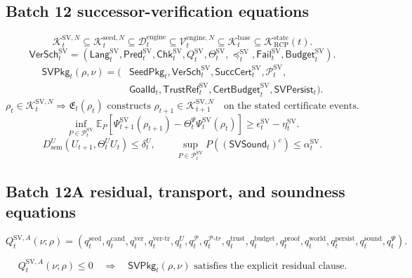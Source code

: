\documentclass[11pt]{article}
\newcommand{\K}{\mathcal{K}}
\newcommand{\Pcal}{\mathcal{P}}
\newcommand{\1}{\mathbf{1}}
\newcommand{\RCP}{\mathrm{RCP}}
\newcommand{\state}{\mathrm{state}}
\providecommand{\Dcal}{\mathcal{D}}
\providecommand{\Kcal}{\mathcal{K}}
\providecommand{\Vcal}{\mathcal{V}}
\providecommand{\sem}{\mathrm{sem}}
\begin{document}
\subsection{Batch 12 successor-verification equations}
\label{subsec:batch12_successor_verification_equations}
\[
\Kcal_t^{\mathrm{SV},N}
\subseteq
\Kcal_t^{\mathrm{seed},N}
\subseteq
\Dcal_t^{\mathrm{engine}}
\subseteq
\Vcal_t^{\mathrm{engine},N}
\subseteq
\Kcal_t^{\mathrm{base}}
\subseteq
\K_{\RCP}^{\state}(t).
\]
\[
\mathsf{VerSch}_t^{\mathrm{SV}}
=
(\mathsf{Lang}_t^{\mathrm{SV}},
 \mathsf{Pred}_t^{\mathrm{SV}},
 \mathsf{Chk}_t^{\mathrm{SV}},
 Q_t^{\mathrm{SV}},
 \Theta_t^{\mathrm{SV}},
 \preceq_t^{\mathrm{SV}},
 \mathsf{Fail}_t^{\mathrm{SV}},
 \mathsf{Budget}_t^{\mathrm{SV}}).
\]
\[
\begin{aligned}
\mathsf{SVPkg}_t(\rho,\nu)=(&\mathsf{SeedPkg}_t,
\mathsf{VerSch}_t^{\mathrm{SV}},
\mathsf{SuccCert}_t^{\mathrm{SV}},
\Pcal_t^{\mathrm{SV}},\\
&\mathsf{GoalId}_t,
\mathsf{TrustRef}_t^{\mathrm{SV}},
\mathsf{CertBudget}_t^{\mathrm{SV}},
\mathsf{SVPersist}_t).
\end{aligned}
\]
\[
\rho_t\in\Kcal_t^{\mathrm{SV},N}
\Longrightarrow
\mathfrak E_t(\rho_t)
\text{ constructs }
\rho_{t+1}\in\Kcal_{t+1}^{\mathrm{SV},N}
\quad
\text{on the stated certificate events.}
\]
\[
\inf_{P\in\Pcal_t^{\mathrm{SV}}}
\mathbb E_P
\left[
\Psi_{t+1}^{\mathrm{SV}}(\rho_{t+1})
-
\Theta_t^\Psi\Psi_t^{\mathrm{SV}}(\rho_t)
\right]
\ge
\epsilon_t^{\mathrm{SV}}-
\eta_t^{\mathrm{SV}}.
\]
\[
D_{\sem}^U(U_{t+1},\Theta_t^U U_t)
\le
\delta_t^U,
\qquad
\sup_{P\in\Pcal_t^{\mathrm{SV}}}
P((\mathsf{SVSound}_t)^c)
\le
\alpha_t^{\mathrm{SV}}.
\]


\subsection{Batch 12A residual, transport, and soundness equations}
\label{subsec:batch12a_residual_transport_soundness_equations}

\[
Q_t^{\mathrm{SV},A}(\nu;\rho)
=
(q_t^{\mathrm{seed}},q_t^{\mathrm{cand}},q_t^{\mathrm{ver}},q_t^{\mathrm{ver\mbox{-}tr}},q_t^{U},q_t^{\Pcal},q_t^{\Pcal\mbox{-}tr},q_t^{\mathrm{trust}},q_t^{\mathrm{budget}},q_t^{\mathrm{proof}},q_t^{\mathrm{world}},q_t^{\mathrm{persist}},q_t^{\mathrm{sound}},q_t^{\Psi}).
\]

\[
Q_t^{\mathrm{SV},A}(\nu;\rho)\le0
\quad\Longrightarrow\quad
\mathsf{SVPkg}_t(\rho,\nu)\text{ satisfies the explicit residual clause.}
\]
\end{document}
